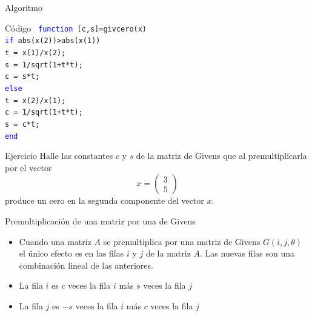 \documentclass{beamer}
\begin{document}
\begin{frame}{Algoritmo}
  \begin{block}{C\'odigo}
  \texttt{
  \hspace{-0.25cm}\textcolor{blue}{function} [c,s]=givcero(x)\\
  \textcolor{blue}{if} abs(x(2))>abs(x(1))\\
  \hspace{0.25cm} t = x(1)/x(2);\\
  \hspace{0.25cm} s = 1/sqrt(1+t*t);\\
  \hspace{0.25cm} c = s*t;\\
  \textcolor{blue}{else}\\
  \hspace{0.25cm} t = x(2)/x(1);\\
  \hspace{0.25cm} c = 1/sqrt(1+t*t);\\
  \hspace{0.25cm} s = c*t;\\
  \textcolor{blue}{end}
  }
  \end{block}
  \end{frame}
  \begin{frame}{Ejercicio}
  Halle las constantes $c$ y $s$ de la matriz de Givens que al premultiplicarla por el vector
  $$
  x = \left(\begin{array}{c}
             3\\
             5
            \end{array}
  \right)
  $$
  produce un cero en la segunda componente del vector $x$.
   
  \end{frame}
\begin{frame}{Premultiplicaci\'on de una matriz por una de Givens}
  \begin{itemize}
   \item Cuando una matriz $A$ se premultiplica por una matriz de Givens $G(i,j,\theta)$ el \'unico efecto es en las filas 
  $i$ y $j$ de la matriz $A$. Las nuevas filas son una combinaci\'on lineal de las anteriores.
  \item <2-> La fila $i$ es $c$ veces la fila $i$ m\'as $s$ veces la fila $j$
  \item <3-> La fila $j$ es $-s$ veces la fila $i$ m\'as $c$ veces la fila $j$
  \end{itemize}  
  \end{frame}
\end{document}

